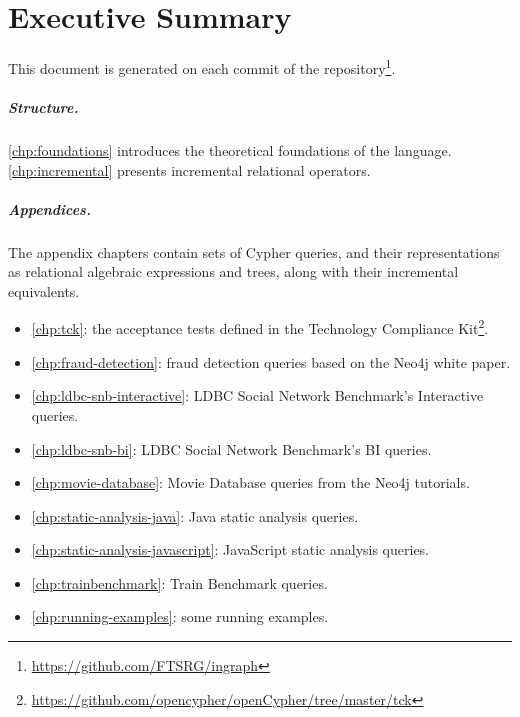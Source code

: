 \chapter*{Executive Summary}
\label{chp:executive-summary}

This document is generated on each commit of the \ingraph repository\footnote{\url{https://github.com/FTSRG/ingraph}}.

\paragraph{Structure.} \autoref{chp:foundations} introduces the theoretical foundations of the \opencypher language. \autoref{chp:incremental} presents incremental relational operators.

\paragraph{Appendices.} The appendix chapters contain sets of Cypher queries, and their representations as relational algebraic expressions and trees, along with their incremental equivalents.

\begin{itemize}
	\item \autoref{chp:tck}: the acceptance tests defined in the \opencypher Technology Compliance Kit\footnote{\url{https://github.com/opencypher/openCypher/tree/master/tck}}.
	\item \autoref{chp:fraud-detection}: fraud detection queries based on the Neo4j white paper.
	\item \autoref{chp:ldbc-snb-interactive}: LDBC Social Network Benchmark's Interactive queries.
  \item \autoref{chp:ldbc-snb-bi}: LDBC Social Network Benchmark's BI queries.
	\item \autoref{chp:movie-database}: Movie Database queries from the Neo4j tutorials.
	\item \autoref{chp:static-analysis-java}: Java static analysis queries.
	\item \autoref{chp:static-analysis-javascript}: JavaScript static analysis queries.
	\item \autoref{chp:trainbenchmark}: Train Benchmark queries.
	\item \autoref{chp:running-examples}: some running examples.
\end{itemize}
